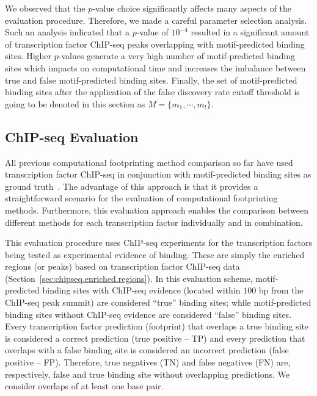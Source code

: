 We observed that the $p$-value choice significantly affects many aspects of the evaluation procedure. Therefore, we made a careful parameter selection analysis. Such an analysis indicated that a $p$-value of $10^{-4}$ resulted in a significant amount of transcription factor ChIP-seq peaks overlapping with motif-predicted binding sites. Higher $p$-values generate a very high number of motif-predicted binding sites which impacts on computational time and increases the imbalance between true and false motif-predicted binding sites. Finally, the set of motif-predicted binding sites after the application of the false discovery rate cutoff threshold is going to be denoted in this section as $M = \{ {m}_{1}, \cdots, {m}_{l} \}$.

\subsection{ChIP-seq Evaluation}
\label{sec:chipseq.evaluation}

All previous computational footprinting method comparison so far have used transcription factor ChIP-seq in conjunction with motif-predicted binding sites as ground truth~\cite{pique2011,boyle2011,cuellar2012}. The advantage of this approach is that it provides a straightforward scenario for the evaluation of computational footprinting methods. Furthermore, this evaluation approach enables the comparison between different methods for each transcription factor individually and in combination.

This evaluation procedure uses ChIP-seq experiments for the transcription factors being tested as experimental evidence of binding. These are simply the enriched regions (or peaks) based on transcription factor ChIP-seq data (Section~\ref{sec:chipseq.enriched.regions}). In this evaluation scheme, motif-predicted binding sites with ChIP-seq evidence (located within $100$ bp from the ChIP-seq peak summit) are considered ``true'' binding sites; while motif-predicted binding sites without ChIP-seq evidence are considered ``false'' binding sites. Every transcription factor prediction (footprint) that overlaps a true binding site is considered a correct prediction (true positive -- TP) and every prediction that overlaps with a false binding site is considered an incorrect prediction (false positive -- FP). Therefore, true negatives (TN) and false negatives (FN) are, respectively, false and true binding site without overlapping predictions. We consider overlaps of at least one base pair.

